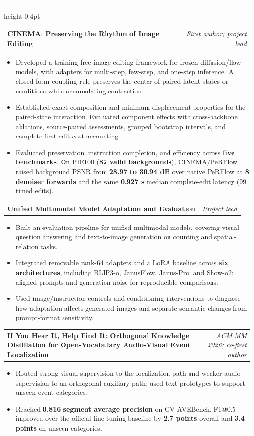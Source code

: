 \documentclass[10pt]{article}
\makeatletter
\newcommand{\cvsection}[1]{\par\addvspace{11pt}\Needspace{4\baselineskip}{\fontsize{13}{15.5}\selectfont\bfseries #1\par}\nobreak\vspace{2pt}\hrule height 0.4pt\nobreak\vspace{5pt}}
\newcommand{\researchentry}[2]{\par\addvspace{4pt}\Needspace{5\baselineskip}\begin{tabularx}{\linewidth}{@{}>{\raggedright\arraybackslash}X@{\hspace{1em}}r@{}}\textbf{#1} & {\small\textit{#2}}\end{tabularx}\par}
\makeatother
\begin{document}
\newpage
\cvsection{Research experience}
\researchentry{CINEMA: Preserving the Rhythm of Image Editing}{First author; project lead}
\begin{itemize}
\item Developed a training-free image-editing framework for frozen diffusion/flow models, with adapters for multi-step, few-step, and one-step inference. A closed-form coupling rule preserves the center of paired latent states or conditions while accumulating contraction.
\item Established exact composition and minimum-displacement properties for the paired-state interaction. Evaluated component effects with cross-backbone ablations, source-paired assessments, grouped bootstrap intervals, and complete first-edit cost accounting.
\item Evaluated preservation, instruction completion, and efficiency across \textbf{five benchmarks}. On PIE100 (\textbf{82 valid backgrounds}), CINEMA/PeRFlow raised background PSNR from \textbf{28.97 to 30.94 dB} over native PeRFlow at \textbf{8 denoiser forwards} and the same \textbf{0.927 s} median complete-edit latency (99 timed edits).
\end{itemize}
\researchentry{Unified Multimodal Model Adaptation and Evaluation}{Project lead}
\begin{itemize}
\item Built an evaluation pipeline for unified multimodal models, covering visual question answering and text-to-image generation on counting and spatial-relation tasks.
\item Integrated removable rank-64 adapters and a LoRA baseline across \textbf{six architectures}, including BLIP3-o, JanusFlow, Janus-Pro, and Show-o2; aligned prompts and generation noise for reproducible comparisons.
\item Used image/instruction controls and conditioning interventions to diagnose how adaptation affects generated images and separate semantic changes from prompt-format sensitivity.
\end{itemize}
\researchentry{If You Hear It, Help Find It: Orthogonal Knowledge Distillation for Open-Vocabulary Audio-Visual Event Localization}{ACM MM 2026; co-first author}
\begin{itemize}
\item Routed strong visual supervision to the localization path and weaker audio supervision to an orthogonal auxiliary path; used text prototypes to support unseen event categories.
\item Reached \textbf{0.816 segment average precision} on OV-AVEBench. F1@0.5 improved over the official fine-tuning baseline by \textbf{2.7 points} overall and \textbf{3.4 points} on unseen categories.
\end{itemize}
\end{document}
